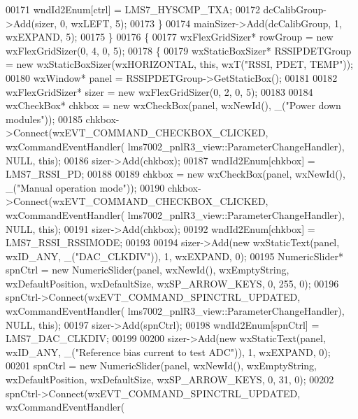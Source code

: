 \begin{DoxyCode}
00171             wndId2Enum[ctrl] = LMS7_HYSCMP_TXA;
00172             dcCalibGroup->Add(sizer, 0, wxLEFT, 5);
00173         \}
00174         mainSizer->Add(dcCalibGroup, 1, wxEXPAND, 5);
00175     \}
00176     \{
00177         wxFlexGridSizer* rowGroup = \textcolor{keyword}{new} wxFlexGridSizer(0, 4, 0, 5);
00178         \{
00179             wxStaticBoxSizer* RSSIPDETGroup = \textcolor{keyword}{new} wxStaticBoxSizer(wxHORIZONTAL, \textcolor{keyword}{this}, wxT(\textcolor{stringliteral}{"RSSI, PDET,
       TEMP"}));
00180             wxWindow* panel = RSSIPDETGroup->GetStaticBox();
00181 
00182             wxFlexGridSizer* sizer = \textcolor{keyword}{new} wxFlexGridSizer(0, 2, 0, 5);
00183 
00184             wxCheckBox* chkbox = \textcolor{keyword}{new} wxCheckBox(panel, wxNewId(), \_(\textcolor{stringliteral}{"Power down modules"}));
00185             chkbox->Connect(wxEVT\_COMMAND\_CHECKBOX\_CLICKED, wxCommandEventHandler(
      lms7002_pnlR3_view::ParameterChangeHandler), NULL, \textcolor{keyword}{this});
00186             sizer->Add(chkbox);
00187             wndId2Enum[chkbox] = LMS7_RSSI_PD;
00188 
00189             chkbox = \textcolor{keyword}{new} wxCheckBox(panel, wxNewId(), \_(\textcolor{stringliteral}{"Manual operation mode"}));
00190             chkbox->Connect(wxEVT\_COMMAND\_CHECKBOX\_CLICKED, wxCommandEventHandler(
      lms7002_pnlR3_view::ParameterChangeHandler), NULL, \textcolor{keyword}{this});
00191             sizer->Add(chkbox);
00192             wndId2Enum[chkbox] = LMS7_RSSI_RSSIMODE;
00193 
00194             sizer->Add(\textcolor{keyword}{new} wxStaticText(panel, wxID\_ANY, \_(\textcolor{stringliteral}{"DAC\_CLKDIV"})), 1, wxEXPAND, 0);
00195             NumericSlider* spnCtrl = \textcolor{keyword}{new} NumericSlider(panel, wxNewId(), wxEmptyString, wxDefaultPosition, 
      wxDefaultSize, wxSP\_ARROW\_KEYS, 0, 255, 0);
00196             spnCtrl->Connect(wxEVT\_COMMAND\_SPINCTRL\_UPDATED, wxCommandEventHandler(
      lms7002_pnlR3_view::ParameterChangeHandler), NULL, \textcolor{keyword}{this});
00197             sizer->Add(spnCtrl);
00198             wndId2Enum[spnCtrl] = LMS7_DAC_CLKDIV;
00199 
00200             sizer->Add(\textcolor{keyword}{new} wxStaticText(panel, wxID\_ANY, \_(\textcolor{stringliteral}{"Reference bias current to test ADC"})), 1, 
      wxEXPAND, 0);
00201             spnCtrl = \textcolor{keyword}{new} NumericSlider(panel, wxNewId(), wxEmptyString, wxDefaultPosition, wxDefaultSize, 
      wxSP\_ARROW\_KEYS, 0, 31, 0);
00202             spnCtrl->Connect(wxEVT\_COMMAND\_SPINCTRL\_UPDATED, wxCommandEventHandler(

\end{DoxyCode}
